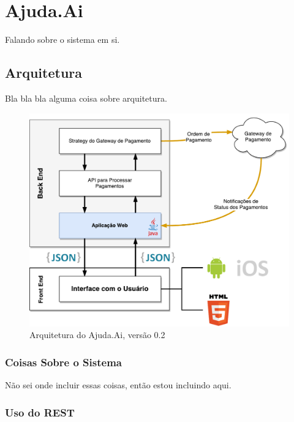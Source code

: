 \chapter{Ajuda.Ai}

Falando sobre o sistema em si.

\section{Arquitetura}

Bla bla bla alguma coisa sobre arquitetura.

\begin{figure}[H]
  \caption{\label{fig_circulo}Arquitetura do Ajuda.Ai, versão 0.2}
  \centering
  \includegraphics[scale=0.7]{imagens/AjudaAi-Arquitetura-3.pdf}
\end{figure}

\subsection{Coisas Sobre o Sistema}

Não sei onde incluir essas coisas, então estou incluindo aqui.

\subsection{Uso do REST}

